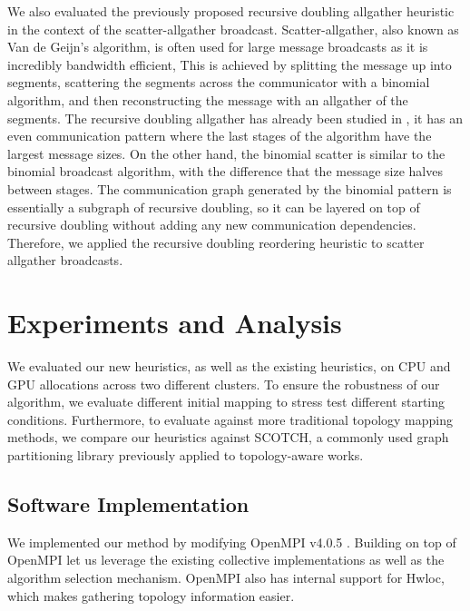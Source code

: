 We also evaluated the previously proposed recursive doubling allgather heuristic in the context of the scatter-allgather broadcast.
Scatter-allgather, also known as Van de Geijn's algorithm, is often used for large message broadcasts as it is incredibly bandwidth efficient, 
This is achieved by splitting the message up into segments, scattering the segments across the communicator with a binomial algorithm, and then reconstructing the message with an allgather of the segments.
The recursive doubling allgather has already been studied in \cite{Mirsadeghi2016TopoAwareCollRR}, it has an even communication pattern where the last stages of the algorithm have the largest message sizes.
On the other hand, the binomial scatter is similar to the binomial broadcast algorithm, with the difference that the message size halves between stages. 
The communication graph generated by the binomial pattern is essentially a subgraph of recursive doubling, so it can be layered on top of recursive doubling without adding any new communication dependencies. 
Therefore, we applied the recursive doubling reordering heuristic to scatter allgather broadcasts.

\section{Experiments and Analysis}
We evaluated our new heuristics, as well as the existing heuristics, on CPU and GPU allocations across two different clusters.
To ensure the robustness of our algorithm, we evaluate different initial mapping to stress test different starting conditions.
Furthermore, to evaluate against more traditional topology mapping methods, we compare our heuristics against SCOTCH, a commonly used graph partitioning library previously applied to topology-aware works.

\subsection{Software Implementation}
We implemented our method by modifying OpenMPI v4.0.5 \cite{gabriel2004OpenMPI}.
Building on top of OpenMPI let us leverage the existing collective implementations as well as the algorithm selection mechanism.
OpenMPI also has internal support for Hwloc, which makes gathering topology information easier.


